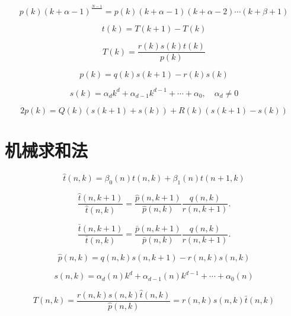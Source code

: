 \begin{equation}
    p(k)(k+\alpha-1)^{\frac{N-1}{}}=p(k)(k+\alpha-1)(k+\alpha-2) \cdots(k+\beta+1)
\end{equation}

\begin{equation}
    t(k)=T(k+1)-T(k)
\end{equation}

\begin{equation}
    T(k)=\frac{r(k) s(k) t(k)}{p(k)}
\end{equation}

\begin{equation}
    p(k)=q(k) s(k+1)-r(k) s(k)
\end{equation}

\begin{equation}
    s(k)=\alpha_{d} k^{d}+\alpha_{d-1} k^{d-1}+\cdots+\alpha_{0}, \quad \alpha_{d} \neq 0
\end{equation}

\begin{equation}
    2 p(k)=Q(k)(s(k+1)+s(k))+R(k)(s(k+1)-s(k))
\end{equation}

\section{机械求和法}

\setcounter{equation}{125}
\begin{equation}
    \hat{t}(n, k)=\beta_{0}(n) t(n, k)+\beta_{1}(n) t(n+1, k)
\end{equation}

\begin{equation}
    \frac{\hat{t}(n, k+1)}{\hat{t}(n, k)}=\frac{\hat{p}(n, k+1)}{\hat{p}(n, k)} \frac{q(n, k)}{r(n, k+1)} .
\end{equation}

\begin{equation}
    \frac{\bar{t}(n, k+1)}{\bar{t}(n, k)}=\frac{\bar{p}(n, k+1)}{\bar{p}(n, k)} \frac{q(n, k)}{r(n, k+1)} .
\end{equation}

\begin{equation}
    \hat{p}(n, k)=q(n, k) s(n, k+1)-r(n, k) s(n, k)
\end{equation}

\begin{equation}
    s(n, k)=\alpha_{d}(n) k^{d}+\alpha_{d-1}(n) k^{d-1}+\cdots+\alpha_{0}(n)
\end{equation}

\begin{equation}
    T(n, k)=\frac{r(n, k) s(n, k) \hat{t}(n, k)}{\hat{p}(n, k)}=r(n, k) s(n, k) \bar{t}(n, k)
\end{equation}